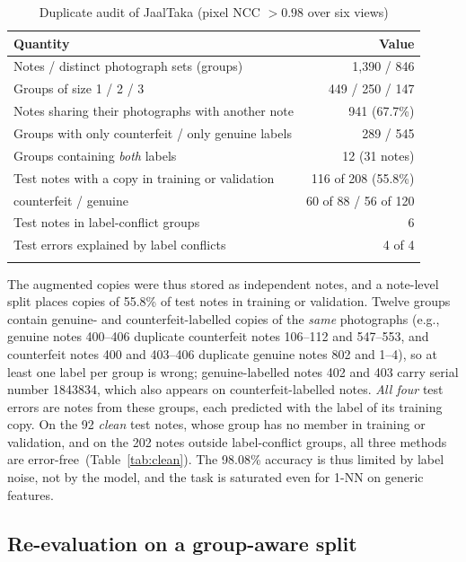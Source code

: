 \documentclass[pdflatex,sn-mathphys-num]{sn-jnl}
\begin{document}
\begin{table}[!t]
\caption{Duplicate audit of JaalTaka (pixel NCC $>0.98$ over six views)}\label{tab:audit}
\begin{tabular*}{\textwidth}{@{\extracolsep\fill}lr}
\toprule
Quantity & Value \\
\midrule
Notes / distinct photograph sets (groups) & 1{,}390 / 846 \\
Groups of size 1 / 2 / 3 & 449 / 250 / 147 \\
Notes sharing their photographs with another note & 941 (67.7\%) \\
Groups with only counterfeit / only genuine labels & 289 / 545 \\
Groups containing \emph{both} labels & 12 (31 notes) \\
\midrule
Test notes with a copy in training or validation & 116 of 208 (55.8\%) \\
\quad counterfeit / genuine & 60 of 88 / 56 of 120 \\
Test notes in label-conflict groups & 6 \\
Test errors explained by label conflicts & 4 of 4 \\
\botrule
\end{tabular*}
\end{table}

The augmented copies were thus stored as independent notes, and a note-level split
places copies of 55.8\% of test notes in training or validation. Twelve groups contain
genuine- and counterfeit-labelled copies of the \emph{same} photographs (e.g., genuine
notes 400--406 duplicate counterfeit notes 106--112 and 547--553, and counterfeit notes
400 and 403--406 duplicate genuine notes 802 and 1--4), so at least one label per group
is wrong; genuine-labelled notes 402 and 403 carry serial number 1843834, which also
appears on counterfeit-labelled notes. \emph{All four} test errors are notes from these
groups, each predicted with the label of its training copy. On the 92 \emph{clean} test
notes, whose group has no member in training or validation, and on the 202 notes outside
label-conflict groups, all three methods are error-free~(Table~\ref{tab:clean}). The
98.08\% accuracy is thus limited by label noise, not by the model, and the task is
saturated even for 1-NN on generic features.

\subsection{Re-evaluation on a group-aware split}\label{sec:groupsplit}
\end{document}
